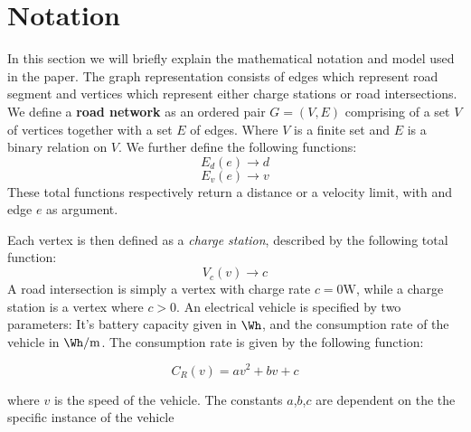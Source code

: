 \section{Notation}
In this section we will briefly explain the mathematical notation and model used in the paper. The graph representation consists of edges which represent road segment and vertices which represent either charge stations or road intersections. We define a \textbf{road network} as an ordered pair \(G=(V,E)\) comprising of a set $V$ of vertices together with a set $E$ of edges. Where $V$ is a finite set and $E$ is a binary relation on $V$. We further define the following functions:
\[ E_d(e)\rightarrow d \] 
\[ E_v(e)\rightarrow v \] 
These total functions respectively return a distance or a velocity limit, with and edge $e$ as argument.

Each vertex is then defined as a \textit{charge station}, described by the following total function:
\[V_c(v)\rightarrow c\]
A road intersection is simply a vertex with charge rate $c = 0\si{\W}$, while a charge station is a vertex where $c > 0$. An electrical vehicle is specified by two parameters: It's battery capacity given in $\si{\Wh}$, and the consumption rate of the vehicle in $\si{\Wh\per\metre}$. The consumption rate is given by the following function:

\[C_R(v)=av^2+bv+c\]

where $v$ is the speed of the vehicle. The constants $a$,$b$,$c$ are dependent on the the specific instance of the vehicle  


